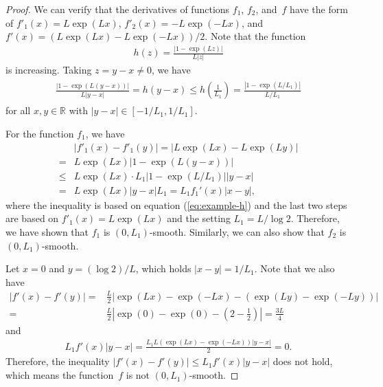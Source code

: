\documentclass[10pt,a4paper]{amsart}
\def\BR{{\mathbb{R}}}
\begin{document}
\begin{proof}
We can verify that the derivatives of functions $f_1$, $f_2$, and~$f$ have the form of $f'_1(x) = L\exp(Lx)$, $f'_2(x) = -L\exp(-Lx)$, and $f'(x) = (L\exp(Lx)-L\exp(-Lx))/{2}$.
Note that the function
\begin{align*}
    h(z) = \frac{|1-\exp(Lz)|}{L|z|} 
\end{align*}
is increasing.
Taking $z=y-x\neq 0$, we have
\begin{align}\label{eq:example-h}
\begin{split}    
  \frac{|1-\exp(L(y-x))|}{L|y-x|} 
= h(y-x)  
\leq   h\left(\frac{1}{L_1}\right)  
= \frac{|1-\exp(L/L_1)|}{L/L_1}
\end{split}
\end{align}
for all $x,y\in\BR$ with $|y-x|\in[-1/L_1, 1/L_1]$.

For the function $f_1$, we have
\begin{align*}
  &  |f'_1(x) - f'_1(y)|  
=   |L\exp(Lx) - L\exp(Ly)| \\
= & L\exp(Lx)|1-\exp(L(y-x))|  \\
\leq &  L\exp(Lx) \cdot L_1|1-\exp(L/L_1)||y-x|  \\
= & L \exp(Lx) |y-x| L_1 
=   L_1 f_1'(x)|x-y|,
\end{align*}
where the inequality is based on equation (\ref{eq:example-h}) and the last two steps are based on $f'_1(x) = L\exp(Lx)$ and the setting $L_1=L/\log 2$.
Therefore, we have shown that $f_1$ is $(0,L_1)$-smooth. 
Similarly, we can also show that $f_2$ is $(0,L_1)$-smooth. 

Let $x=0$ and $y=(\log 2)/L$, which holds $|x-y|=1/L_1$.
Note that we also have
\begin{align*}
    |f'(x) - f'(y)|  
=& \frac{L}{2}\left|\exp(Lx)\!-\!\exp(-Lx) -(\exp(Ly)\!-\!\exp(-Ly))\right| \\
=& \frac{L}{2}\left|\exp(0)-\exp(0) -\left(2-\frac{1}{2}\right)\right| = \frac{3L}{4}
\end{align*}
and
\begin{align*}
    L_1f'(x)|y-x| = \frac{L_1L(\exp(Lx)-\exp(-Lx))|y-x|}{2} = 0.
\end{align*}
Therefore, the inequality $|f'(x) - f'(y)| \leq L_1 f'(x)|y-x|$ does not hold, which means the function~$f$ is not $(0,L_1)$-smooth.
\end{proof}
\end{document}
